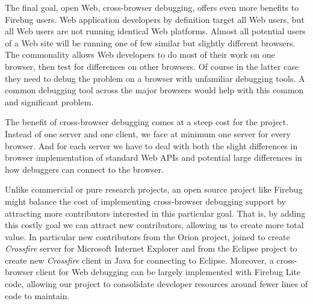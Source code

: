 The final goal, open Web, cross-browser debugging, offers even more benefits to
Firebug users.  Web application developers by definition target all Web users,
but all Web users are not running identical Web platforms. Almost all
potential users of a Web site will be running one of few similar but slightly
different browsers. The commonality allows Web developers to do most of their
work on one browser, then test for differences on other browsers. Of course in
the latter case they need to debug the problem on a browser with unfamiliar debugging
tools. A common debugging tool across the major browsers would help with this
common and significant problem.

The benefit of cross-browser debugging comes at a steep cost for the project.
Instead of one server and one client, we face at minimum one server for every
browser. And for each server we have to deal with both the slight differences in
browser implementation of standard Web APIs and potential large differences in
how debuggers can connect to the browser.

Unlike commercial or pure research projects, an open source project like Firebug
might balance the cost of
implementing cross-browser debugging support by attracting more contributors
interested in this particular goal. That is, by adding this costly goal we can
attract new contributors, allowing us to create more total value. In particular
new contributors from the Orion project\cite{orion}, joined to create
\textit{Crossfire} server for Microsoft Internet Explorer and from the Eclipse
project\cite{EclipseJSDT} to create new \textit{Crossfire} client in Java for
connecting to Eclipse.   Moreover, a cross-browser client for Web debugging can be largely
implemented with Firebug Lite code, allowing our project to consolidate
developer resources around fewer lines of code to maintain.

